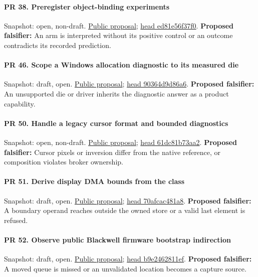 \paragraph{PR 38. Preregister object-binding experiments}
\readcode Snapshot: open, non-draft.
\href{\repobase/pull/38}{Public proposal};
\href{\repobase/commit/ed81e56f37f01f9a78d897b9bf5426d528223d34}{head ed81e56f37f0}.
\textbf{Proposed falsifier:} An arm is interpreted without its positive control or an outcome
  contradicts its recorded prediction.

\paragraph{PR 46. Scope a Windows allocation diagnostic to its measured die}
\readcode Snapshot: draft, open.
\href{\repobase/pull/46}{Public proposal};
\href{\repobase/commit/90364d9d86a634f6319352f42549cacaa77ed9e7}{head 90364d9d86a6}.
\textbf{Proposed falsifier:} An unsupported die or driver inherits the diagnostic answer as a
  product capability.

\paragraph{PR 50. Handle a legacy cursor format and bounded diagnostics}
\readcode Snapshot: open, non-draft.
\href{\repobase/pull/50}{Public proposal};
\href{\repobase/commit/61dc81b73aa2ed25fb07d5b922f88eb450c410e7}{head 61dc81b73aa2}.
\textbf{Proposed falsifier:} Cursor pixels or inversion differ from the native reference, or
  composition violates broker ownership.

\paragraph{PR 51. Derive display DMA bounds from the class}
\readcode Snapshot: draft, open.
\href{\repobase/pull/51}{Public proposal};
\href{\repobase/commit/70afcac481a861def36a4368595524f3a41d8a57}{head 70afcac481a8}.
\textbf{Proposed falsifier:} A boundary operand reaches outside the owned store or a valid last
  element is refused.

\paragraph{PR 52. Observe public Blackwell firmware bootstrap indirection}
\readcode Snapshot: draft, open.
\href{\repobase/pull/52}{Public proposal};
\href{\repobase/commit/b9e2462811ef0310b72fa029c7af2a7325d06289}{head b9e2462811ef}.
\textbf{Proposed falsifier:} A moved queue is missed or an unvalidated location becomes a capture
  source.

